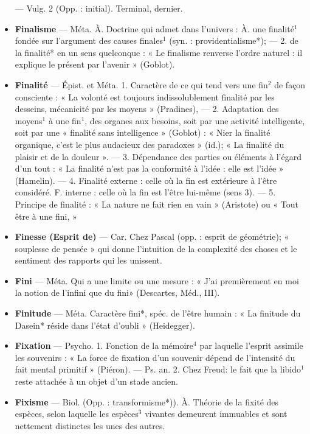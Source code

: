 \begin{itemize}[leftmargin=1cm, label=, itemsep=1pt]
— Vulg. 2 (Opp. : initial). Terminal, dernier.

\item {\bf Finalisme} — Méta. À. Doctrine qui
admet dans l’univers : À. une finalité$^1$ fondée sur l'argument des
causes finales$^1$ (syn. : providentialisme*); — 2. de la finalité* en un
sens quelconque : « Le finalisme renverse l’ordre naturel : il explique le
présent par l'avenir » (Goblot).

\item {\bf Finalité} — Épist. et Méta. 1. Caractère de ce qui tend vers une fin$^2$ de
façon consciente : « La volonté est
toujours indissolublement finalité
par les desseins, mécanicité par les
moyens » (Pradines), — 2. Adaptation des moyens$^1$ à une fin$^1$, des
organes aux besoins, soit par une
activité intelligente, soit par une
« finalité sans intelligence » (Goblot) :
« Nier la finalité organique, c'est le
plus audacieux des paradoxes » (id.);
« La finalité du plaisir et de la douleur ».
— 3. Dépendance des parties
ou éléments à l'égard d’un tout :
« La finalité n’est pas la conformité
à l’idée : elle est l'idée » (Hamelin).
— 4. Finalité externe : celle où la
fin est extérieure à l'être considéré.
F. interne : celle où la fin est l'être
lui-même (sens 3). — 5. Principe de
finalité : « La nature ne fait rien en
vain » (Aristote) ou « Tout être à
une fini, »

\item {\bf Finesse (Esprit de)} — Car. Chez
Pascal (opp. : esprit de géométrie);
« souplesse de pensée » qui donne
l'intuition de la complexité des
choses et le sentiment des rapports
qui les unissent.

\item {\bf Fini} — Méta. Qui a une limite ou une
mesure : « J’ai premièrement en
moi la notion de l'infini que du fini»
(Descartes, Méd., III).

\item {\bf Finitude} — Méta. Caractère fini*, spéc.
de l'être humain : « La finitude du
Dasein* réside dans l’état d’oubli »
(Heidegger).

\item {\bf Fixation} — Psycho. 1. Fonction de la
mémoire$^4$ par laquelle l’esprit assimile les souvenirs : « La force de
fixation d’un souvenir dépend de
l'intensité du fait mental primitif »
(Piéron). — Ps. an. 2. Chez Freud:
le fait que la libido$^1$ reste attachée
à un objet d’un stade ancien.

\item {\bf Fixisme} — Biol. (Opp. : transformisme*)). À. Théorie de la fixité des
espèces, selon laquelle les espèces$^3$
vivantes demeurent immuables et
sont nettement distinctes les unes
des autres.


\end{itemize}
